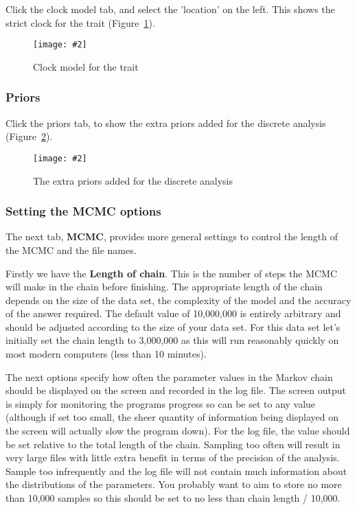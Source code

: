 \documentclass{article}
\newcommand{\includeimage}[2][]{%
\texttt{[image: \#2]}
}
\begin{document}
Click the clock model tab, and select the 'location' on the left.
This shows the strict clock for the trait (Figure~\ref{fig.BEAUti_clockmodel2}).

\begin{figure}
\centering	
\includeimage[scale=0.3,clip=true,trim=0 400 0 0]{figures/BEAUti_clockmodel2}
\caption{Clock model for the trait}
\label{fig.BEAUti_clockmodel2}
\end{figure}

\subsubsection*{Priors}

Click the priors tab, to show the extra priors added for the discrete analysis (Figure~\ref{fig.BEAUti_priors2}).

\begin{figure}
\centering	
\includeimage[scale=0.3,clip=true,trim=0 400 0 0]{figures/BEAUti_priors2}
\caption{The extra priors added for the discrete analysis}
\label{fig.BEAUti_priors2}
\end{figure}

\subsubsection*{Setting the MCMC options }

The next tab, {\bf MCMC}, provides more general
settings to control the length of the MCMC and the file names. 

Firstly we have the \textbf{Length of chain}. This is the number of
steps the MCMC will make in the chain before finishing. The appropriate length of the chain depends on the size of the data set, the complexity of the
model and the accuracy of the answer required. The default value of 10,000,000
is entirely arbitrary and should be adjusted according to the size
of your data set. For this data set let's initially set the chain
length to 3,000,000 as this will run reasonably quickly on most modern
computers (less than 10 minutes).

The next options specify how often the parameter values in the Markov
chain should be displayed on the screen and recorded in the log file.
The screen output is simply for monitoring the programs progress so
can be set to any value (although if set too small, the sheer quantity
of information being displayed on the screen will actually slow the
program down). For the log file, the value should be set relative
to the total length of the chain. Sampling too often will result in
very large files with little extra benefit in terms of the precision
of the analysis. Sample too infrequently and the log file will not
contain much information about the distributions of the parameters. 
You probably want to aim to store no more than 10,000 samples so this should be
set to no less than chain length / 10,000.
\end{document}
